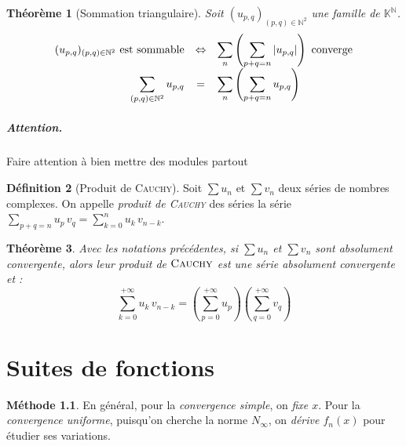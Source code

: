 \documentclass[11pt,a4paper]{report}
\newtheorem{theorem}{Théorème}[chapter]
\newtheorem{itheorem}[theorem]{Théorème}
\theoremstyle{definition}
\newtheorem{dfn}[theorem]{Définition}
\newtheorem{methode}[theorem]{Méthode}
\begin{document}
\begin{itheorem}[Sommation triangulaire]
     Soit $(u_{p,q})_{(p,q)\in \mathbb{N}^2}$ une famille de $\mathbb{K}^{\mathbb{N}}$.\newline
     \begin{equation}
          \begin{array}{r c l}
               (u_{p,q})_{(p,q)\in \mathbb{N}^2} \text{ est sommable} & \Leftrightarrow & \displaystyle\sum_n \left( \displaystyle\sum_{p+q = n} |u_{p,q}| \right)\text{ converge} \\
               \displaystyle\sum_{(p,q)\in \mathbb{N}^2} u_{p,q} & = & \displaystyle\sum_n \left( \displaystyle\sum_{p+q = n} u_{p,q} \right) \\
          \end{array}
     \end{equation}
\end{itheorem}
\paragraph{Attention.} Faire attention à bien mettre des modules partout
\begin{dfn}[Produit de \textsc{Cauchy}]
     Soit $\sum u_n$ et $\sum v_n$ deux séries de nombres complexes. On appelle \emph{produit de \textsc{Cauchy}} des séries la série $\sum_{p+q=n} u_p\, v_q = \sum_{k=0}^n u_k \, v_{n-k}$.
\end{dfn}
\begin{theorem}
     Avec les notations précédentes, si $\sum u_n$ et $\sum v_n$ sont absolument convergente, alors leur produit de $\textsc{Cauchy}$ est une série absolument convergente et : 
        \begin{equation}
        \sum_{k=0}^{+\infty} u_k \, v_{n-k} = \left( \sum_{p=0}^{+\infty} u_p \right) \left( \sum_{q=0}^{+\infty} v_q \right) 
        \end{equation}
        
\end{theorem}


\chapter{Suites de fonctions}
\begin{methode}
    En général, pour la \emph{convergence simple}, on \emph{fixe $x$}. Pour la \emph{convergence uniforme}, puisqu'on cherche la norme $N_\infty$, on \emph{dérive $f_n(x)$} pour étudier ses variations.
\end{methode}
\end{document}
